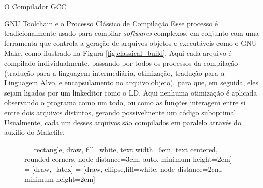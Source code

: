 \begin{section}{O Compilador GCC}
\begin{subsection}{GNU Toolchain e o Processo Clássico de Compilação}
Esse processo é tradicionalmente usado para compilar \textit{softwares} complexos,
em conjunto com uma ferramenta que controla a geração de arquivos objetos e executáveis
como o GNU Make, como ilustrado na Figura \ref{fig:classical_build}. Aqui cada arquivo
é compilado individualmente, passando por todos os processos da compilação (tradução
para a linguagem intermediária, otimização, tradução para a Linguagem Alvo,
e encapsulamento no arquivo objeto), para que, em seguida, eles sejam ligados por um
linkeditor como o LD. 
Aqui nenhuma otimização é aplicada observando o programa
como um todo, ou como as funções interagem entre si entre dois arquivos distintos,
gerando possivelmente um código suboptimal.
Usualmente, cada um desses arquivos
são compilados em paralelo através do auxilio do Makefile.

\begin{figure}
 = [rectangle, draw, fill=white,
    text width=6em, text centered, rounded corners, node distance=3cm, auto, minimum height=2em]
 = [draw, -latex]
 = [draw, ellipse,fill=white, node distance=2cm,
    minimum height=2em]
\begin{center}
\end{center}
\end{figure}
\end{subsection}
\end{section}
